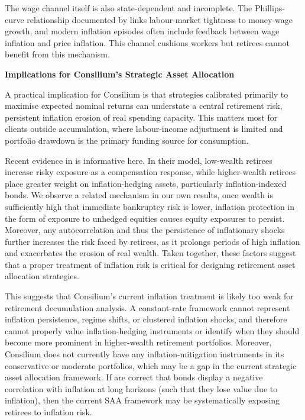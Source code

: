 \documentclass[11pt]{article}
\newcommand{\asideboxtitle}[1]{\noindent\textbf{\large #1}\par\vspace{0.5em}}
\begin{document}
The wage channel itself is also state-dependent and incomplete. The Phillips-curve relationship documented by \textcite{phillips1958relation} links labour-market tightness to money-wage growth, and modern inflation episodes often include feedback between wage inflation and price inflation. This channel cushions workers but retirees cannot benefit from this mechanism.

\begin{asidebox}
  \asideboxtitle{Implications for Consilium's Strategic Asset Allocation}

  A practical implication for Consilium is that strategies calibrated primarily to maximise expected nominal returns can understate a central retirement risk, persistent inflation erosion of real spending capacity. This matters most for clients outside accumulation, where labour-income adjustment is limited and portfolio drawdown is the primary funding source for consumption.

  Recent evidence in \textcite{lin2024optimal} is informative here. In their model, low-wealth retirees increase risky exposure as a compensation response, while higher-wealth retirees place greater weight on inflation-hedging assets, particularly inflation-indexed bonds. We observe a related mechanism in our own results, once wealth is sufficiently high that immediate bankruptcy risk is lower, inflation protection in the form of exposure to unhedged equities causes equity exposures to persist. Moreover, any autocorrelation and thus the persistence of inflationary shocks further increases the risk faced by retirees, as it prolongs periods of high inflation and exacerbates the erosion of real wealth. Taken together, these factors suggest that a proper treatment of inflation risk is critical for designing retirement asset allocation strategies. 

  This suggests that Consilium's current inflation treatment is likely too weak for retirement decumulation analysis. A constant-rate framework cannot represent inflation persistence, regime shifts, or clustered inflation shocks, and therefore cannot properly value inflation-hedging instruments or identify when they should become more prominent in higher-wealth retirement portfolios. Moreover, Consilium does not currently have any inflation-mitigation instruments in its conservative or moderate portfolios, which may be a gap in the current strategic asset allocation framework. If \textcite{anarkulova2025beyond} are correct that bonds display a negative correlation with inflation at long horizons (such that they lose value due to inflation), then the current SAA framework may be systematically exposing retirees to inflation risk. 
\end{asidebox}
\end{document}
